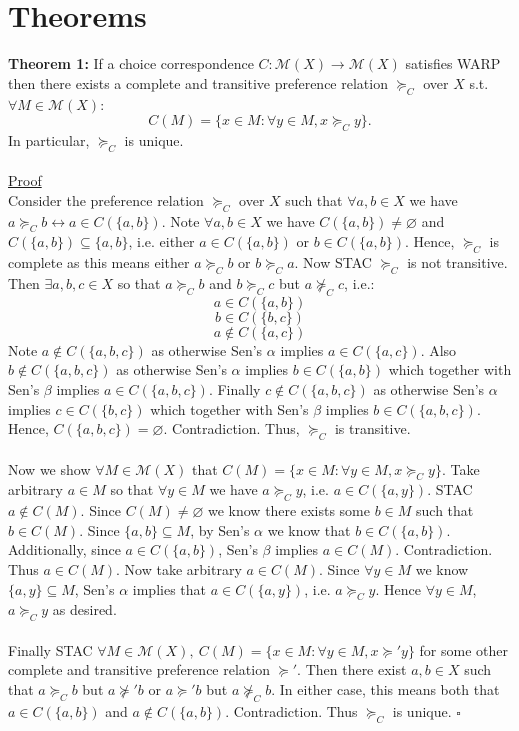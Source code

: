 \documentclass[11pt]{article}
\theoremstyle{definition}
\theoremstyle{plain}
\begin{document}
\section{Theorems}
\textbf{Theorem 1:} If a choice correspondence $C: \mathcal{M}(X) \to \mathcal{M}(X)$ satisfies WARP then there exists a complete and transitive preference relation $\succeq_C$ over $X$ s.t. $\forall M \in \mathcal{M}(X)$:
$$C(M)=\{x \in M : \forall y \in M, x \succeq_C y\}.$$
In particular, $\succeq_C$ is unique.  
\\
\\
\underline{Proof}
\\
Consider the preference relation $\succeq_C$ over $X$ such that $\forall a,b \in X$ we have $a \succeq_C b \leftrightarrow a \in C(\{a,b\})$. Note $\forall a,b \in X$ we have $C(\{a,b\}) \neq \varnothing$ and $C(\{a,b\}) \subseteq \{a,b\}$, i.e. either $a \in C(\{a,b\})$ or $b \in C(\{a,b\})$. Hence, $\succeq_C$ is complete as this means either $a \succeq_C b$ or $b \succeq_C a$. Now STAC $\succeq_C$ is not transitive. Then $\exists a,b,c \in X$ so that $a \succeq_C b$ and $b \succeq_C c$ but $a \not \succeq_C c$, i.e.:
$$a \in C(\{a,b\})$$
$$b \in C(\{b,c\})$$
$$a \notin C(\{a,c\})$$
Note $a \notin C(\{a,b,c\})$ as otherwise Sen's $\alpha$ implies $a \in C(\{a,c\})$. Also $b \notin C(\{a,b,c\})$ as otherwise Sen's $\alpha$ implies $b \in C(\{a,b\})$ which together with Sen's $\beta$ implies $a \in C(\{a,b,c\})$. Finally $c \notin C(\{a,b,c\})$ as otherwise Sen's $\alpha$ implies $c \in C(\{b,c\})$ which together with Sen's $\beta$ implies $b \in C(\{a,b,c\})$. Hence, $C(\{a,b,c\})=\varnothing$. Contradiction. Thus, $\succeq_C$ is transitive. 
\\
\\
Now we show $\forall M \in \mathcal{M}(X)$ that $C(M)=\{x \in M : \forall y \in M, x \succeq_C y\}.$ Take arbitrary $a \in M$ so that $\forall y \in M$ we have $a \succeq_C y$, i.e. $a \in C(\{a,y\})$. STAC $a \notin C(M)$. Since $C(M)\neq \varnothing$ we know there exists some $b \in M$ such that $b \in C(M)$. Since $\{a,b\} \subseteq M$, by Sen's $\alpha$ we know that $b \in C(\{a,b\})$. Additionally, since $a \in C(\{a,b\})$, Sen's $\beta$ implies $a \in C(M)$. Contradiction. Thus $a \in C(M)$. Now take arbitrary $a \in C(M)$. Since $\forall y \in M$ we know $\{a,y\} \subseteq M$,  Sen's $\alpha$ implies that $a \in C(\{a,y\})$, i.e. $a \succeq_C y$. Hence $\forall y \in M$, $a \succeq_C y$ as desired.   
\\
\\
Finally STAC $\forall M \in \mathcal{M}(X), \ C(M)=\{x \in M : \forall y \in M, x \succeq' y\}$ for some other complete and transitive preference relation $\succeq'$. Then there exist $a,b \in X$ such that $a \succeq_C b$ but $a \not \succeq' b$ or $a \succeq' b$ but $a \not \succeq_C b$. In either case, this means both that $a \in C(\{a,b\})$ and $a \notin C(\{a,b\})$. Contradiction. Thus $\succeq_C$ is unique. $\square$
\end{document}
